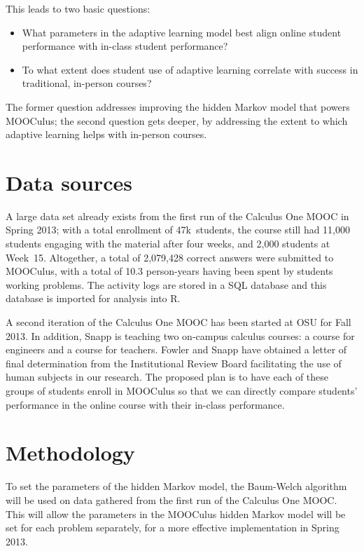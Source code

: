 \documentclass[12pt]{article}
\begin{document}
This leads to two basic questions:
\begin{itemize}
\item What parameters in the adaptive
  learning model best align online student performance with in-class
  student performance?
\item To what extent does student use
  of adaptive learning correlate with success in traditional,
  in-person courses?
\end{itemize}
The former question addresses improving the hidden Markov model that
powers MOOCulus; the second question gets deeper, by addressing the
extent to which adaptive learning helps with in-person courses.

\section{Data sources}

A large data set already exists from the first run of the Calculus One
MOOC in Spring 2013; with a total enrollment of 47k~students, the
course still had 11,000 students engaging with the material after four
weeks, and 2,000 students at Week~15.  Altogether, a total of
2,079,428 correct answers were submitted to MOOCulus, with a total of
10.3 person-years having been spent by students working problems.  The
activity logs are stored in a SQL database and this database is
imported for analysis into R.

A second iteration of the Calculus One MOOC has been started at OSU
for Fall 2013.  In addition, Snapp is teaching two on-campus calculus
courses: a course for engineers and a course for teachers.  Fowler and
Snapp have obtained a letter of final determination from the
Institutional Review Board facilitating the use of human subjects in
our research.  The proposed plan is to have each of these groups of
students enroll in MOOCulus so that we can directly compare students'
performance in the online course with their in-class performance.


\section{Methodology}

To set the parameters of the hidden Markov model, the Baum-Welch
algorithm will be used on data gathered from the first run of the
Calculus One MOOC. This will allow the parameters in the MOOCulus
hidden Markov model will be set for each problem separately, for a
more effective implementation in Spring 2013.
\end{document}
